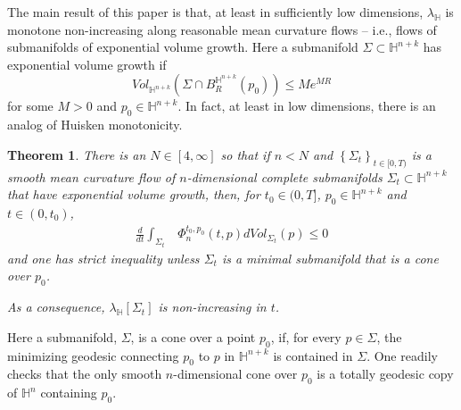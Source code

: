 \documentclass{amsart}
\newtheorem{thm}{Theorem}[section]
\theoremstyle{definition}
\theoremstyle{remark}
\numberwithin{equation}{section}
\newcommand{\set}[1]{\left\{#1\right\}}
\begin{document}
The main result of this paper is that, at least in sufficiently low dimensions, $\lambda_{\mathbb{H}}$ is monotone non-increasing along reasonable mean curvature flows -- i.e., flows of submanifolds of exponential volume growth.   Here a submanifold $\Sigma \subset \mathbb{H}^{n+k}$ has exponential volume growth if
$$
Vol_{\mathbb{H}^{n+k}}\left(\Sigma\cap B_{R}^{\mathbb{H}^{n+k}}(p_0)\right)\leq M e^{M R}
$$
for some $M>0$ and $p_0\in \mathbb{H}^{n+k}$.  In fact, at least in low dimensions, there is an analog of Huisken monotonicity.
\begin{thm}\label{MainThm}
	There is an $N\in [4, \infty]$ so that if $n<N$ and $\set{\Sigma_t}_{t\in [0,T)}$ is a smooth mean curvature flow of $n$-dimensional complete submanifolds $\Sigma_t\subset \mathbb{H}^{n+k}$ that have exponential volume growth, then, for $t_0\in (0,T]$, $p_0\in \mathbb{H}^{n+k}$ and $t\in (0,t_0)$,
	\begin{align*}
	\frac{d}{dt} \int_{\Sigma_t} &\Phi_n^{t_0,p_0}(t, p) dVol_{\Sigma_t}(p) \leq 0
	\end{align*}
   and one has strict inequality unless $\Sigma_t$ is a minimal submanifold that is a cone over $p_0$.
    
    As a consequence, $\lambda_{\mathbb{H}}[\Sigma_t]$ is non-increasing in $t$.
\end{thm}
Here a submanifold, $\Sigma$, is a cone over a point $p_0$, if,  for every $p\in \Sigma$, the minimizing geodesic connecting $p_0$ to $p$ in $\mathbb{H}^{n+k}$ is contained in $\Sigma$.  One readily checks that the only smooth $n$-dimensional cone over $p_0$ is a totally geodesic copy of $\mathbb{H}^n$ containing $p_0$.
\end{document}
